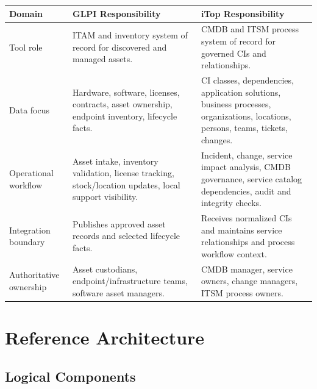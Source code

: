 \documentclass[11pt]{article}
\begin{document}
\begin{longtable}{>{\raggedright\arraybackslash}p{\dimexpr 0.26667\dimexpr\linewidth-6\tabcolsep\relax\relax}>{\raggedright\arraybackslash}p{\dimexpr 0.36667\dimexpr\linewidth-6\tabcolsep\relax\relax}>{\raggedright\arraybackslash}p{\dimexpr 0.36667\dimexpr\linewidth-6\tabcolsep\relax\relax}}
\toprule
\rowcolor{LightBlue}\textbf{Domain} & \textbf{GLPI Responsibility} & \textbf{iTop Responsibility} \\
\midrule
Tool role & ITAM and inventory system of record for discovered and managed assets. & CMDB and ITSM process system of record for governed CIs and relationships. \\
\addlinespace
Data focus & Hardware, software, licenses, contracts, asset ownership, endpoint inventory, lifecycle facts. & CI classes, dependencies, application solutions, business processes, organizations, locations, persons, teams, tickets, changes. \\
\addlinespace
Operational workflow & Asset intake, inventory validation, license tracking, stock/location updates, local support visibility. & Incident, change, service impact analysis, CMDB governance, service catalog dependencies, audit and integrity checks. \\
\addlinespace
Integration boundary & Publishes approved asset records and selected lifecycle facts. & Receives normalized CIs and maintains service relationships and process workflow context. \\
\addlinespace
Authoritative ownership & Asset custodians, endpoint/infrastructure teams, software asset managers. & CMDB manager, service owners, change managers, ITSM process owners. \\
\bottomrule
\end{longtable}

\section{Reference Architecture}

\subsection{Logical Components}
\end{document}

